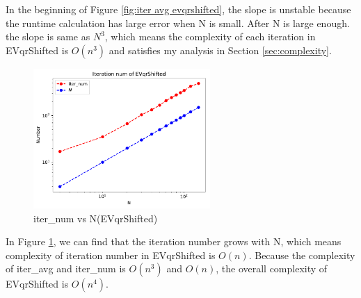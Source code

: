 \documentclass{article}
\begin{document}
In the beginning of Figure \ref{fig:iter avg evqrshifted}, the slope is unstable because the runtime calculation has large error when N is small.
After N is large enough. the slope is same as $N^3$, which means the complexity of each iteration in EVqrShifted is {\boldmath$O(n^3)$} and 
satisfies my analysis in Section \ref{sec:complexity}.
\begin{figure}[H]
    \centering
    \includegraphics[width=0.6\textwidth]{src/iter_num_shifted.pdf}
    \caption{iter\_num vs N(EVqrShifted)}
    \label{fig:iter num evqrshifted}
\end{figure}
In Figure \ref{fig:iter num evqrshifted}, we can find that the iteration number grows with N, which means complexity of  iteration number 
in EVqrShifted is {\boldmath$O(n)$}. Because the complexity of iter\_avg and iter\_num is $O(n^3)$ and $O(n)$, the overall complexity of
EVqrShifted is {\boldmath$O(n^4)$}.
\end{document}
